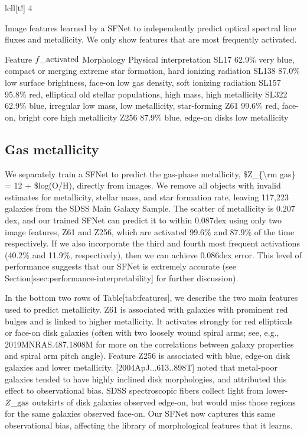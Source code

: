 \documentclass[11pt,a4paper]{article}
\begin{document}
lcll[t!]
4

Image features learned by a SFNet to independently predict optical spectral line fluxes and metallicity. We only show features that are most frequently activated.

Feature 
 $f\_{\rm activated}$ 
 Morphology 
 Physical interpretation
SL17  62.9\%  very blue, compact or merging  extreme star formation, hard ionizing radiation 
SL138  87.0\%  low surface brightness, face-on  low gas density, soft ionizing radiation 
SL157  95.8\%  red, elliptical  old stellar populations, high mass, high metallicity 
SL322  62.9\%  blue, irregular  low mass, low metallicity, star-forming 
Z61  99.6\%  red, face-on, bright core  high metallicity 
Z256  87.9\%  blue, edge-on disks  low metallicity

\subsection{Gas metallicity}

We separately train a SFNet to predict the gas-phase metallicity, \$Z\_\{\textbackslash{}rm gas\} = 12 + \$log(O/H), directly from images. We remove all objects with invalid estimates for metallicity, stellar mass, and star formation rate, leaving 117,223 galaxies from the SDSS Main Galaxy Sample. The scatter of metallicity is $0.207$dex, and our trained SFNet can predict it to within $0.087$dex using only two image features, Z61 and Z256, which are activated 99.6\% and 87.9\% of the time respectively. If we also incorporate the third and fourth most frequent activations (40.2\% and 11.9\%, respectively), then we can achieve $0.086$dex error. This level of performance suggests that our SFNet is extremely accurate (see Section[ssec:performance-interpretability] for further discussion).

In the bottom two rows of Table[tab:features], we describe the two main features used to predict metallicity. Z61 is associated with galaxies with prominent red bulges and is linked to higher metallicity. It activates strongly for red ellipticals or face-on disk galaxies (often with two loosely wound spiral arms; see, e.g., 2019MNRAS.487.1808M for more on the correlations between galaxy properties and spiral arm pitch angle).  Feature Z256 is associated with blue, edge-on disk galaxies and lower metallicity. 
[2004ApJ...613..898T] noted that metal-poor galaxies tended to have highly inclined disk morphologies, and attributed this effect to observational bias. SDSS spectroscopic fibers collect light from lower-$Z\_{\rm gas}$  outskirts of disk galaxies observed edge-on, but would miss those regions for the same galaxies observed face-on. Our SFNet now captures this same observational bias, affecting the library of morphological features that it learns.
\end{document}
